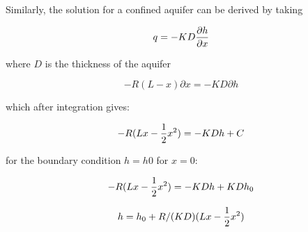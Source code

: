 \documentclass[11pt]{article}
\begin{document}
Similarly, the solution for a confined aquifer can be derived by taking

\begin{equation}
    q = - K D {\partial h \over{\partial x}}
\end{equation}

where $D$ is the thickness of the aquifer

\begin{equation}
    - R (L-x) \partial x = - K D \partial h
\end{equation}

which after integration gives:

\begin{equation}
    - R (Lx - {1\over{2}} x^{2}) = - K D h + C
\end{equation}

for the boundary condition $h = h0$ for $x = 0$:

\begin{equation}
    - R (Lx - {1\over{2}} x^{2}) = - K D h + K D h_{0}
\end{equation}

\begin{equation}
    h = h_{0} + R/(KD) (Lx - {1\over{2}} x^{2})
\end{equation}





\end{document}
